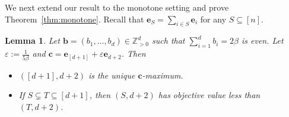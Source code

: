 \documentclass[centering,11pt,reqno]{amsart}
\newtheorem{lem}[theorem]{Lemma}
\theoremstyle{definition}
\begin{document}
We next extend our result to the monotone setting and prove Theorem~\ref{thm:monotone}. Recall that $\mathbf{e}_{S} = \sum_{i \in S} \mathbf{e}_{i}$ for any $S \subseteq [n]$. 

\begin{lem}
\label{lem:monotone}
Let $\mathbf{b} = (b_{1}, \dots, b_{d}) \in \mathbb{Z}^{d}_{> 0}$ such that $\sum_{i=1}^{d} b_{i} = 2\beta$ is even. Let $\varepsilon:=\frac{1}{5\beta}$ and $\mathbf{c} = \mathbf{e}_{[d+1]} + \varepsilon \mathbf{e}_{d+2}$. Then 
\begin{itemize}
    \item $([d+1], d+2)$ is the unique $\mathbf{c}$-maximum.
    \item If $S \subsetneq T \subseteq [d+1] $, then $(S, d+2)$ has objective value less than $(T,d+2)$.
\end{itemize}
\end{lem}
\end{document}
